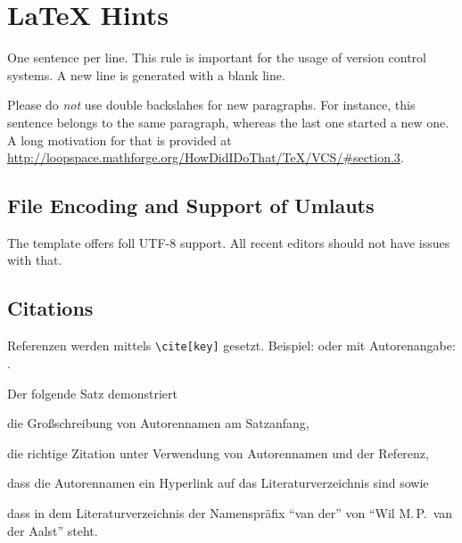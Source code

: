 
\chapter{LaTeX Hints}
\label{chap:latexhints}

One sentence per line.
This rule is important for the usage of version control systems.
A new line is generated with a blank line.

Please do \textit{not} use double backslahes for new paragraphs.
For instance, this sentence belongs to the same paragraph, whereas the last one started a new one.
A long motivation for that is provided at \url{http://loopspace.mathforge.org/HowDidIDoThat/TeX/VCS/#section.3}.

\section{File Encoding and Support of Umlauts}
\label{sec:firstsectioninlatexhints}
The template offers foll UTF-8 support.
All recent editors should not have issues with that.

\section{Citations}
Referenzen werden mittels \texttt{\textbackslash cite[key]} gesetzt.
Beispiel: \cite{WSPA} oder mit Autorenangabe: \citet{WSPA}.

Der folgende Satz demonstriert 
\begin{filecontents*}{\democodefile}
\begin{inparaenum}[1.]
  \item die Großschreibung von Autorennamen am Satzanfang,
  \item die richtige Zitation unter Verwendung von Autorennamen und der Referenz,
  \item dass die Autorennamen ein Hyperlink auf das Literaturverzeichnis sind sowie
  \item dass in dem Literaturverzeichnis der Namenspräfix \enquote{van der} von \enquote{Wil M.\,P.\ van der Aalst} steht.
\end{inparaenum}
\end{filecontents*}

